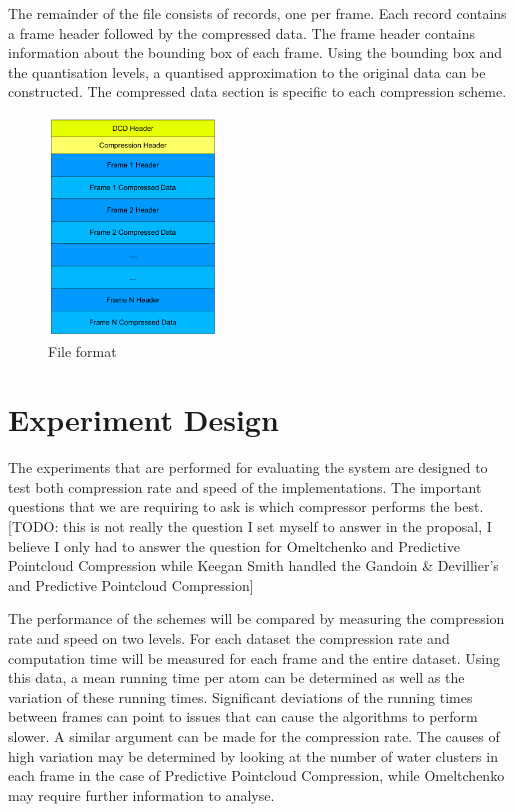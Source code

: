 \documentclass[a4paper,11pt]{report}
\begin{document}
The remainder of the file consists of records, one per frame. Each record contains a frame header followed by the compressed data. The frame header contains information about the bounding box of each frame. Using the bounding box and the quantisation levels, a quantised approximation to the original data can be constructed. The compressed data section is specific to each compression scheme.

\begin{figure}
 \center
 \includegraphics[width=0.4\textwidth]{resources/FileFormat.png}
\caption{File format}
\label{sysbreak}
\end{figure}


\section{Experiment Design}

The experiments that are performed for evaluating the system are designed to test both compression rate and speed of the implementations. The important questions that we are requiring to ask is which compressor performs the best. [TODO: this is not really the question I set myself to answer in the proposal, I believe I only had to answer the question for Omeltchenko and Predictive Pointcloud Compression while Keegan Smith handled the Gandoin \& Devillier's and Predictive Pointcloud Compression]

The performance of the schemes will be compared by measuring the compression rate and speed on two levels. For each dataset the compression rate and computation time will be measured for each frame and the entire dataset. Using this data, a mean running time per atom can be determined as well as the variation of these running times. Significant deviations of the running times between frames can point to issues that can cause the algorithms to perform slower. A similar argument can be made for the compression rate. The causes of high variation may be determined by looking at the number of water clusters in each frame in the case of Predictive Pointcloud Compression, while Omeltchenko may require further information to analyse.
\end{document}
